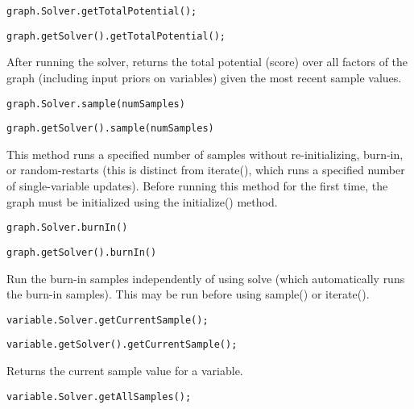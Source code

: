 \ifmatlab
\begin{lstlisting}
graph.Solver.getTotalPotential();
\end{lstlisting}
\fi

\ifjava
\begin{lstlisting}
graph.getSolver().getTotalPotential();
\end{lstlisting}
\fi

After running the solver, returns the total potential (score) over all factors of the graph (including input priors on variables) given the most recent sample values.

\ifmatlab
\begin{lstlisting}
graph.Solver.sample(numSamples)
\end{lstlisting}
\fi

\ifjava
\begin{lstlisting}
graph.getSolver().sample(numSamples)
\end{lstlisting}
\fi

This method runs a specified number of samples without re-initializing, burn-in, or random-restarts (this is distinct from iterate(), which runs a specified number of single-variable updates).  Before running this method for the first time, the graph must be initialized using the initialize() method.

\ifmatlab
\begin{lstlisting}
graph.Solver.burnIn()
\end{lstlisting}
\fi

\ifjava
\begin{lstlisting}
graph.getSolver().burnIn()
\end{lstlisting}
\fi

Run the burn-in samples independently of using solve (which automatically runs the burn-in samples).  This may be run before using sample() or iterate().


\ifmatlab
\begin{lstlisting}
variable.Solver.getCurrentSample();
\end{lstlisting}
\fi

\ifjava
\begin{lstlisting}
variable.getSolver().getCurrentSample();
\end{lstlisting}
\fi

Returns the current sample value for a variable.

\ifmatlab
\begin{lstlisting}
variable.Solver.getAllSamples();
\end{lstlisting}
\fi


